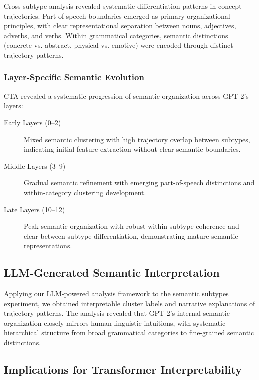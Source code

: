Cross-subtype analysis revealed systematic differentiation patterns in concept trajectories. Part-of-speech boundaries emerged as primary organizational principles, with clear representational separation between nouns, adjectives, adverbs, and verbs. Within grammatical categories, semantic distinctions (concrete vs. abstract, physical vs. emotive) were encoded through distinct trajectory patterns.

\subsubsection{Layer-Specific Semantic Evolution}

CTA revealed a systematic progression of semantic organization across GPT-2's layers:

\begin{description}
    \item[Early Layers (0--2)] Mixed semantic clustering with high trajectory overlap between subtypes, indicating initial feature extraction without clear semantic boundaries.
    
    \item[Middle Layers (3--9)] Gradual semantic refinement with emerging part-of-speech distinctions and within-category clustering development.
    
    \item[Late Layers (10--12)] Peak semantic organization with robust within-subtype coherence and clear between-subtype differentiation, demonstrating mature semantic representations.
\end{description}

\subsection{LLM-Generated Semantic Interpretation}

Applying our LLM-powered analysis framework to the semantic subtypes experiment, we obtained interpretable cluster labels and narrative explanations of trajectory patterns. The analysis revealed that GPT-2's internal semantic organization closely mirrors human linguistic intuitions, with systematic hierarchical structure from broad grammatical categories to fine-grained semantic distinctions.

\subsection{Implications for Transformer Interpretability}

